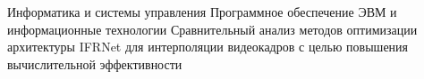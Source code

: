 \documentclass{bmstu}
\begin{document}
	
	\makethesistitle
		{Информатика и системы управления} %
		{Программное обеспечение ЭВМ и информационные технологии} %
		{Сравнительный анализ методов оптимизации архитектуры IFRNet для интерполяции видеокадров с целью повышения вычислительной эффективности} %
		{} %
		{} %
		{} %
		{ }
	
%	
	
	\setcounter{page}{2}
%	
	\maketableofcontents
%	
	
	
	
	
	
	\makebibliography
	
%	
	
\end{document}
